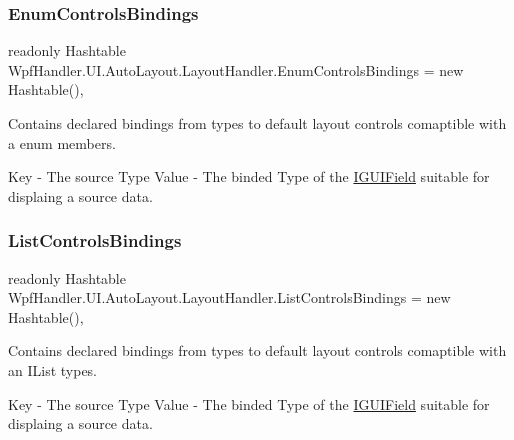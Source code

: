 \subsubsection{\texorpdfstring{Enum\+Controls\+Bindings}{EnumControlsBindings}}
{\footnotesize\ttfamily readonly Hashtable Wpf\+Handler.\+U\+I.\+Auto\+Layout.\+Layout\+Handler.\+Enum\+Controls\+Bindings = new Hashtable()\hspace{0.3cm}{\ttfamily [static]}, {\ttfamily [private]}}



Contains declared bindings from types to default layout controls comaptible with a enum members. 

Key -\/ The source Type Value -\/ The binded Type of the \mbox{\hyperlink{interface_wpf_handler_1_1_u_i_1_1_auto_layout_1_1_i_g_u_i_field}{I\+G\+U\+I\+Field}} suitable for displaing a source data. \mbox{\label{class_wpf_handler_1_1_u_i_1_1_auto_layout_1_1_layout_handler_aec598e1921c5fe2ba40f57772be8ac5d}} 
\subsubsection{\texorpdfstring{List\+Controls\+Bindings}{ListControlsBindings}}
{\footnotesize\ttfamily readonly Hashtable Wpf\+Handler.\+U\+I.\+Auto\+Layout.\+Layout\+Handler.\+List\+Controls\+Bindings = new Hashtable()\hspace{0.3cm}{\ttfamily [static]}, {\ttfamily [private]}}



Contains declared bindings from types to default layout controls comaptible with an I\+List types. 

Key -\/ The source Type Value -\/ The binded Type of the \mbox{\hyperlink{interface_wpf_handler_1_1_u_i_1_1_auto_layout_1_1_i_g_u_i_field}{I\+G\+U\+I\+Field}} suitable for displaing a source data. \mbox{\label{class_wpf_handler_1_1_u_i_1_1_auto_layout_1_1_layout_handler_afda300c91d5d5e45c7fb51d1154fcf4b}} 
